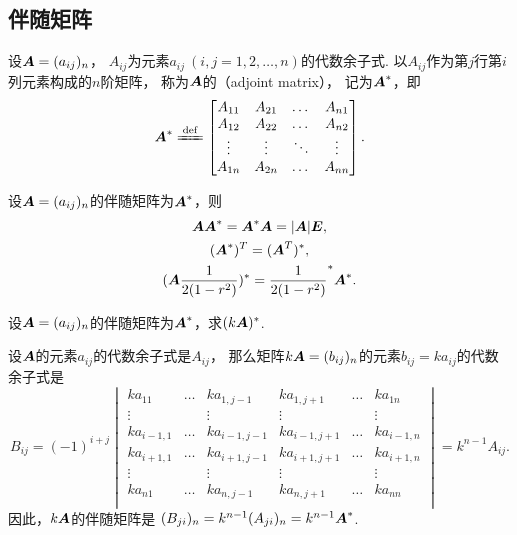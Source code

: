 \subsection{伴随矩阵}
\begin{definition}\label{definition:伴随矩阵.伴随矩阵的定义}
设\(\boldsymbol{A}=(a_{ij})_n\)，
\(A_{ij}\)为元素\(a_{ij}\ (i,j=1,2,\dotsc,n)\)的代数余子式.
以\(A_{ij}\)作为第\(j\)行第\(i\)列元素构成的\(n\)阶矩阵，
称为\(\boldsymbol{A}\)的（adjoint matrix），
记为\(\boldsymbol{A}^*\)，即\[
	\A^*
	\defeq \begin{bmatrix}
		A_{11} & A_{21} & \dots & A_{n1} \\
		A_{12} & A_{22} & \dots & A_{n2} \\
		\vdots & \vdots & \ddots & \vdots \\
		A_{1n} & A_{2n} & \dots & A_{nn}
	\end{bmatrix}.
\]
\end{definition}

\begin{theorem}
设\(\boldsymbol{A}=(a_{ij})_n\)的伴随矩阵为\(\boldsymbol{A}^*\)，则\begin{gather}
\boldsymbol{A} \boldsymbol{A}^* = \boldsymbol{A}^* \boldsymbol{A} = \abs{\boldsymbol{A}} \boldsymbol{E}, \label{equation:行列式.伴随矩阵.恒等式1} \\
(\boldsymbol{A}^*)^T = (\boldsymbol{A}^T)^*, \label{equation:行列式.伴随矩阵.恒等式2} \\
(\boldsymbol{A}\frac{1}{2(1-r^2)})^* = \frac{1}{2(1-r^2)}^* \boldsymbol{A}^*. \label{equation:行列式.伴随矩阵.恒等式3}
\end{gather}
\end{theorem}

\begin{example}
设\(\boldsymbol{A}=(a_{ij})_n\)的伴随矩阵为\(\boldsymbol{A}^*\)，求\((k\boldsymbol{A})^*\).
\begin{solution}
设\(\boldsymbol{A}\)的元素\(a_{ij}\)的代数余子式是\(A_{ij}\)，%
那么矩阵\(k\boldsymbol{A} = (b_{ij})_n\)的元素\(b_{ij} = k a_{ij}\)的代数余子式是\[
	B_{ij}
	= (-1)^{i+j} \begin{vmatrix}
		k a_{11} & \dots & k a_{1,j-1} & k a_{1,j+1} & \dots & k a_{1n} \\
		\vdots & & \vdots & \vdots & & \vdots \\
		k a_{i-1,1} & \dots & k a_{i-1,j-1} & k a_{i-1,j+1} & \dots & k a_{i-1,n} \\
		k a_{i+1,1} & \dots & k a_{i+1,j-1} & k a_{i+1,j+1} & \dots & k a_{i+1,n} \\
		\vdots & & \vdots & \vdots & & \vdots \\
		k a_{n1} & \dots & k a_{n,j-1} & k a_{n,j+1} & \dots & k a_{nn} \\
	\end{vmatrix}
	= k^{n-1} A_{ij}.
\]
因此，\(k\boldsymbol{A}\)的伴随矩阵是
\((B_{ji})_n = k^{n-1} (A_{ji})_n
= k^{n-1} \boldsymbol{A}^*\).
\end{solution}
\end{example}


